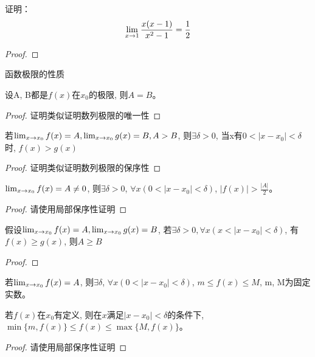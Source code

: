 \documentclass[lang=cn]{elegantbook}
\begin{document}
\begin{proposition}
    证明：
    \[ \lim_{x \to 1 } \frac{x(x-1)}{x^2-1} = \frac{1}{2} \]
\end{proposition}
\begin{proof}
    
\end{proof}

函数极限的性质
\begin{theorem}[函数极限的唯一性]
    设A, B都是$f(x)$在$x_0$的极限, 则$A=B$。 
\end{theorem}
\begin{proof}
    证明类似证明数列极限的唯一性
\end{proof}

\begin{theorem}[函数极限的局部保序性]
    若$\lim_{x \to x_0 } f(x) = A, \lim_{x \to x_0 } g(x) = B, A > B$, 则$\exists \delta > 0$, 当x有$0 < \left| x - x_0 \right| < \delta $时, $f(x) > g(x)$  
\end{theorem}
\begin{proof}
    证明类似证明数列极限的保序性
\end{proof}

\begin{lemma}
    $\lim_{x \to x_0 } f(x) = A \neq 0$, 则$\exists \delta > 0$, $\forall x ( 0 < \left| x - x_0\right| < \delta)$, $\left| f(x) \right| > \frac{\left| A \right|}{2}$。
\end{lemma}
\begin{proof}
    请使用局部保序性证明
\end{proof}

\begin{lemma}
    假设$\lim_{x \to x_0 } f(x) = A, \lim_{x \to x_0 } g(x) = B$, 若$\exists \delta > 0, \forall x (x < \left| x - x_0\right| < \delta)$, 有$f(x) \ge g(x)$, 则$A \ge B$
\end{lemma}
\begin{proof}

\end{proof}


\begin{theorem}[函数极限的局部有界性]
    若$\lim_{x \to x_0 } f(x) = A$, 则$\exists \delta$, $\forall x(0 < \left| x - x_0 \right| < \delta)$, $m \le f(x) \le M$, m, M为固定实数。

    若$f(x)$在$x_0$有定义, 则在$x$满足$\left| x - x_0 \right| < \delta$的条件下, $\min\{m, f(x)\} \le f(x) \le \max\{M, f(x)\}$。
\end{theorem}
\begin{proof}
    请使用局部保序性证明
\end{proof}
\end{document}
